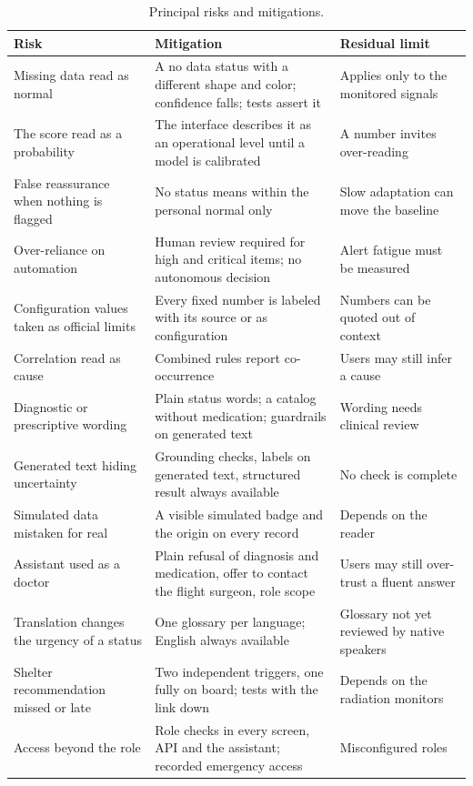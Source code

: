 \begin{table}[htbp]
\centering
\vspace{0.8em}
\caption{Principal risks and mitigations.}
\label{tab:risks}
\footnotesize
\begin{tabular}{p{4.0cm}p{5.6cm}p{4.4cm}}
\hline
\textbf{Risk} & \textbf{Mitigation} & \textbf{Residual limit} \\
\hline
Missing data read as normal & A no data status with a different shape and color; confidence falls; tests assert it & Applies only to the monitored signals \\
The score read as a probability & The interface describes it as an operational level until a model is calibrated & A number invites over-reading \\
False reassurance when nothing is flagged & No status means within the personal normal only & Slow adaptation can move the baseline \\
Over-reliance on automation & Human review required for high and critical items; no autonomous decision & Alert fatigue must be measured \\
Configuration values taken as official limits & Every fixed number is labeled with its source or as configuration & Numbers can be quoted out of context \\
Correlation read as cause & Combined rules report co-occurrence & Users may still infer a cause \\
Diagnostic or prescriptive wording & Plain status words; a catalog without medication; guardrails on generated text & Wording needs clinical review \\
Generated text hiding uncertainty & Grounding checks, labels on generated text, structured result always available & No check is complete \\
Simulated data mistaken for real & A visible simulated badge and the origin on every record & Depends on the reader \\
Assistant used as a doctor & Plain refusal of diagnosis and medication, offer to contact the flight surgeon, role scope & Users may still over-trust a fluent answer \\
Translation changes the urgency of a status & One glossary per language; English always available & Glossary not yet reviewed by native speakers \\
Shelter recommendation missed or late & Two independent triggers, one fully on board; tests with the link down & Depends on the radiation monitors \\
Access beyond the role & Role checks in every screen, API and the assistant; recorded emergency access & Misconfigured roles \\
\hline
\end{tabular}
\vspace{1.2em}
\end{table}

